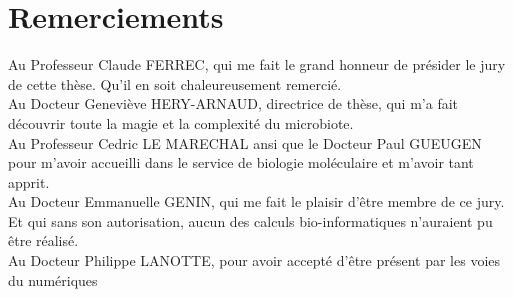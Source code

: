 \documentclass[12pt,a4paper]{article}
\begin{document}
\newpage



\thispagestyle{empty}
\setcounter{page}{0}
\thispagestyle{empty}

\newpage

\section*{Remerciements}
Au Professeur Claude FERREC, qui me fait le grand honneur de présider le jury de cette thèse. Qu'il en soit chaleureusement remercié. \\ 

Au Docteur Geneviève HERY-ARNAUD, directrice de thèse, qui m'a fait découvrir toute la magie et la complexité du microbiote.\\ 

Au Professeur Cedric LE MARECHAL ansi que le Docteur Paul GUEUGEN pour m'avoir accueilli dans le service de biologie moléculaire et m'avoir tant apprit. \\

Au Docteur Emmanuelle GENIN, qui me fait le plaisir d'être membre de ce jury. Et qui sans son autorisation, aucun des calculs bio-informatiques n'auraient pu être réalisé.\\


Au Docteur Philippe LANOTTE, pour avoir accepté d'être présent par les voies du numériques

\newpage
\thispagestyle{empty}
\setcounter{page}{0}
\thispagestyle{empty}
\end{document}
